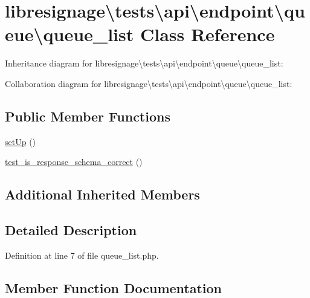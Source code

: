 \hypertarget{classlibresignage_1_1tests_1_1api_1_1endpoint_1_1queue_1_1queue__list}{}\section{libresignage\textbackslash{}tests\textbackslash{}api\textbackslash{}endpoint\textbackslash{}queue\textbackslash{}queue\+\_\+list Class Reference}
\label{classlibresignage_1_1tests_1_1api_1_1endpoint_1_1queue_1_1queue__list}


Inheritance diagram for libresignage\textbackslash{}tests\textbackslash{}api\textbackslash{}endpoint\textbackslash{}queue\textbackslash{}queue\+\_\+list\+:


Collaboration diagram for libresignage\textbackslash{}tests\textbackslash{}api\textbackslash{}endpoint\textbackslash{}queue\textbackslash{}queue\+\_\+list\+:
\subsection*{Public Member Functions}
\begin{DoxyCompactItemize}
\item 
\hyperlink{classlibresignage_1_1tests_1_1api_1_1endpoint_1_1queue_1_1queue__list_a384fe908745767420379beb524c01649}{set\+Up} ()
\item 
\hyperlink{classlibresignage_1_1tests_1_1api_1_1endpoint_1_1queue_1_1queue__list_abab7ebb5536bb477a2338483b67d4d0a}{test\+\_\+is\+\_\+response\+\_\+schema\+\_\+correct} ()
\end{DoxyCompactItemize}
\subsection*{Additional Inherited Members}


\subsection{Detailed Description}


Definition at line 7 of file queue\+\_\+list.\+php.



\subsection{Member Function Documentation}
\mbox{\label{classlibresignage_1_1tests_1_1api_1_1endpoint_1_1queue_1_1queue__list_a384fe908745767420379beb524c01649}} 
